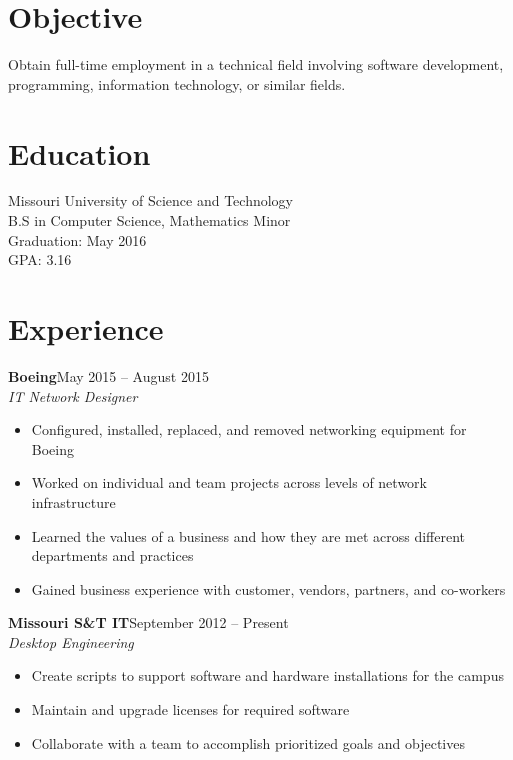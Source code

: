 \documentclass[margin]{res}
\begin{document}
  \begin{resume} 
    \section{Objective} 
      Obtain full-time employment in a technical field involving software development, programming, information technology, or similar fields.

    \section{Education}
      Missouri University of Science and Technology \\ 
      B.S in Computer Science, Mathematics Minor \\
      Graduation: May 2016 \\
      GPA: 3.16

	\section{Experience}
       \textbf{Boeing}\hfill May 2015 -- August 2015 \\
       \textit{IT Network Designer}\hfill 
       \begin{itemize} \itemsep -1pt  %
         \item Configured, installed, replaced, and removed networking equipment for Boeing
         \item Worked on individual and team projects across levels of network infrastructure 
         \item Learned the values of a business and how they are met across different departments and practices
         \item Gained business experience with customer, vendors, partners, and co-workers
       \end{itemize}
       
    \textbf{Missouri S\&T IT}\hfill September 2012 -- Present\\
       \textit{Desktop Engineering}\hfill
       \begin{itemize} \itemsep -1pt  %
         \item Create scripts to support software and hardware installations for the campus
         \item Maintain and upgrade licenses for required software
         \item Collaborate with a team to accomplish prioritized goals and objectives
       \end{itemize}
   

\end{resume}
\end{document}
